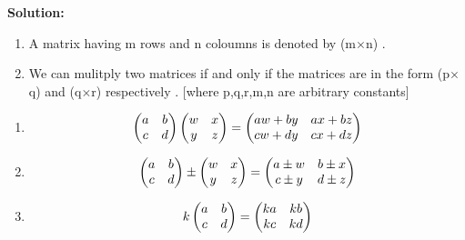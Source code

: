 \documentclass[journal,12pt,twocolumn]{IEEEtran}
\begin{document}
\textbf{Solution:}
       \begin{enumerate}
 \item A matrix having m rows and n coloumns is denoted by
               (m$\times$n) .
  
 \item We can mulitply two matrices if and only if the matrices are 
       in the form (p$\times$q) and (q$\times$r) respectively .
       [where p,q,r,m,n are arbitrary constants]
       \end{enumerate}
       \begin{enumerate}[label=(\roman*)]
 \item \begin{align}
       \label{eq:2} 
       \begin{pmatrix}a & b \\c & d \end{pmatrix} \begin{pmatrix}w & x \\y & z \end{pmatrix} = 
       \begin{pmatrix}aw+ by & ax+ bz \\cw+ dy& cx+ dz\end{pmatrix} 
       \end{align}
 \item \begin{align}
       \label{eq:3}
       \begin{pmatrix}a & b \\c & d \end{pmatrix} 
       \pm \begin{pmatrix}w & x \\y & z \end{pmatrix} =
       \begin{pmatrix}a\pm w & b\pm x \\c\pm y& d\pm z\end{pmatrix} 
       \end{align}
 \item \begin{align}
       \label{eq:4}
       k\begin{pmatrix}a & b \\c & d \end{pmatrix} =
       \begin{pmatrix}ka & kb \\kc & kd \end{pmatrix} 
       \end{align}
       \end{enumerate} 
\end{document}
